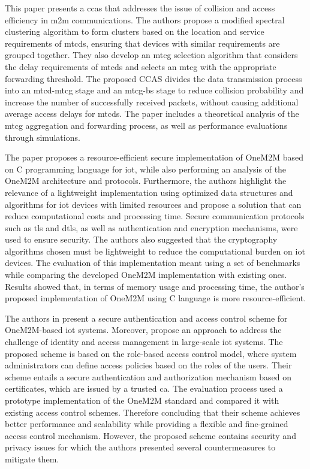 \documentclass[a4paper,fleqn]{cas-dc}
\begin{document}
This paper \cite{Liang2018} presents a \gls{ccas} that addresses the issue of collision and access efficiency in \gls{m2m} communications. The authors propose a modified spectral clustering algorithm to form clusters based on the location and service requirements of \gls{mtcds}, ensuring that devices with similar requirements are grouped together. They also develop an \gls{mtcg} selection algorithm that considers the delay requirements of \gls{mtcds} and selects an \gls{mtcg} with the appropriate forwarding threshold. The proposed CCAS divides the data transmission process into an \gls{mtcd}-\gls{mtcg} stage and an \gls{mtcg}-\gls{bs} stage to reduce collision probability and increase the number of successfully received packets, without causing additional average access delays for \gls{mtcds}. The paper includes a theoretical analysis of the \gls{mtcg} aggregation and forwarding process, as well as performance evaluations through simulations.

The paper \cite{Thielemans2019} proposes a resource-efficient secure implementation of OneM2M based on C programming language for \gls{iot}, while also performing an analysis of the OneM2M architecture and protocols. Furthermore, the authors highlight the relevance of a lightweight implementation using optimized data structures and algorithms for \gls{iot} devices with limited resources and propose a solution that can reduce computational costs and processing time. Secure communication protocols such as \gls{tls} and \gls{dtls}, as well as authentication and encryption mechanisms, were used to ensure security. The authors also suggested that the cryptography algorithms chosen must be lightweight to reduce the computational burden on \gls{iot} devices. The evaluation of this implementation meant using a set of benchmarks while comparing the developed OneM2M implementation with existing ones. Results showed that, in terms of memory usage and processing time, the author's proposed implementation of OneM2M using C language is more resource-efficient.

The authors in \cite{Benoygopal2021} present a secure authentication and access control scheme for OneM2M-based \gls{iot} systems. Moreover, propose an approach to address the challenge of identity and access management in large-scale \gls{iot} systems. The proposed scheme is based on the role-based access control model, where system administrators can define access policies based on the roles of the users. Their scheme entails a secure authentication and authorization mechanism based on certificates, which are issued by a trusted \gls{ca}. The evaluation process used a prototype implementation of the OneM2M standard and compared it with existing access control schemes. Therefore concluding that their scheme achieves better performance and scalability while providing a flexible and fine-grained access control mechanism. However, the proposed scheme contains security and privacy issues for which the authors presented several countermeasures to mitigate them.
\end{document}
